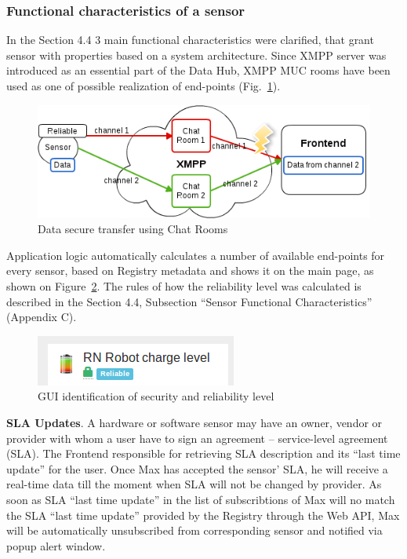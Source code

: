 \subsubsection{Functional characteristics of a sensor}
In the Section 4.4 3 main functional characteristics were clarified, that grant sensor with properties based on a system architecture.
Since XMPP server was introduced as an essential part of the Data Hub, XMPP MUC rooms have been used as one of possible realization of end-points (Fig.~\ref{img:reliability}). 
\begin{figure}[!ht]
\centering
\includegraphics[scale=0.6]{images/security.png}   
\caption[Security]{Data secure transfer using Chat Rooms} 
\label{img:reliability}                        
\end{figure}
Application logic automatically calculates a number of available end-points for every sensor, based on Registry metadata and shows it on the main page, as shown on Figure~\ref{img:icons}. The rules of how the reliability level was calculated is described in the Section 4.4, Subsection ``Sensor Functional Characteristics'' (Appendix C).
\newline
\begin{figure}[!ht]
\centering
\includegraphics[scale=1.0]{Screenshots/Icons.png}   
\caption[GUI identification of security and reliability level]{GUI identification of security and reliability level}
\label{img:icons}    
\end{figure}

\textbf{SLA Updates}. A hardware or software sensor may have an owner, vendor or provider with whom a user have to sign an agreement -- service-level agreement (SLA). The Frontend responsible for retrieving SLA description and its ``last time update'' for the user. Once Max has accepted the sensor' SLA, he will receive a real-time data till the moment when SLA will not be changed by provider. As soon as SLA ``last time update'' in the list of subscribtions of Max will no match the SLA ``last time update'' provided by the Registry through the Web API, Max will be automatically unsubscribed from corresponding sensor and notified via popup alert window.


